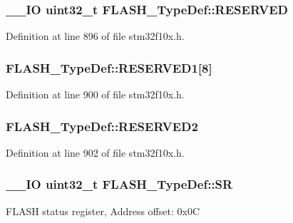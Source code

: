 \hypertarget{struct_f_l_a_s_h___type_def_a32e5cc660e711dc5424f827e2d4efd88}{
\subsubsection[{R\-E\-S\-E\-R\-V\-E\-D}]{\setlength{\rightskip}{0pt plus 5cm}\-\_\-\-\_\-\-I\-O {\bf uint32\-\_\-t} F\-L\-A\-S\-H\-\_\-\-Type\-Def\-::\-R\-E\-S\-E\-R\-V\-E\-D}}\label{struct_f_l_a_s_h___type_def_a32e5cc660e711dc5424f827e2d4efd88}


Definition at line 896 of file stm32f10x.\-h.

\hypertarget{struct_f_l_a_s_h___type_def_a6b72761900a107781af2d902f60f34b3}{
\subsubsection[{R\-E\-S\-E\-R\-V\-E\-D1}]{ F\-L\-A\-S\-H\-\_\-\-Type\-Def\-::\-R\-E\-S\-E\-R\-V\-E\-D1\mbox{[}8\mbox{]}}}\label{struct_f_l_a_s_h___type_def_a6b72761900a107781af2d902f60f34b3}


Definition at line 900 of file stm32f10x.\-h.

\hypertarget{struct_f_l_a_s_h___type_def_a23ed73264a5196d6bfb9f8769797f29c}{
\subsubsection[{R\-E\-S\-E\-R\-V\-E\-D2}]{ F\-L\-A\-S\-H\-\_\-\-Type\-Def\-::\-R\-E\-S\-E\-R\-V\-E\-D2}}\label{struct_f_l_a_s_h___type_def_a23ed73264a5196d6bfb9f8769797f29c}


Definition at line 902 of file stm32f10x.\-h.

\hypertarget{struct_f_l_a_s_h___type_def_a52c4943c64904227a559bf6f14ce4de6}{
\subsubsection[{S\-R}]{\setlength{\rightskip}{0pt plus 5cm}\-\_\-\-\_\-\-I\-O {\bf uint32\-\_\-t} F\-L\-A\-S\-H\-\_\-\-Type\-Def\-::\-S\-R}}\label{struct_f_l_a_s_h___type_def_a52c4943c64904227a559bf6f14ce4de6}
F\-L\-A\-S\-H status register, Address offset\-: 0x0\-C 

